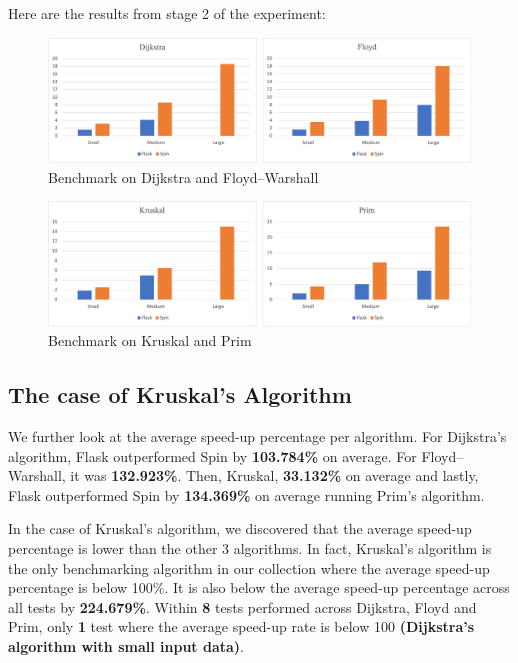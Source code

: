 Here are the results from stage 2 of the experiment:

\bigskip
\begin{figure}[hp]
\centering
\includegraphics[scale=0.33]{images/other1}
\caption{\footnotesize{Benchmark on Dijkstra and Floyd–Warshall}}
\captionsetup{aboveskip=0pt,font=it}
\end{figure}
\bigskip

\newpage
\bigskip
\begin{figure}[hp]
\centering
\includegraphics[scale=0.33]{images/other2}
\caption{\footnotesize{Benchmark on Kruskal and Prim}}
\captionsetup{aboveskip=0pt,font=it}
\end{figure}
\bigskip


\subsection{The case of Kruskal's Algorithm}

We further look at the average speed-up percentage per algorithm. For Dijkstra's algorithm, Flask outperformed Spin by \textbf{103.784\%} on average. For Floyd–Warshall, it was \textbf{132.923\%}. Then, Kruskal, \textbf{33.132\%} on average and lastly, Flask outperformed Spin by \textbf{134.369\%} on average running Prim's algorithm.

In the case of Kruskal's algorithm, we discovered that the average speed-up percentage is lower than the other 3 algorithms. In fact, Kruskal's algorithm is the only benchmarking algorithm in our collection where the average speed-up percentage is below 100\%. It is also below the average speed-up percentage across all tests by \textbf{224.679\%}. Within \textbf{8} tests performed across Dijkstra, Floyd and Prim, only \textbf{1} test where the average speed-up rate is below 100 \textbf{(Dijkstra's algorithm with small input data)}.

